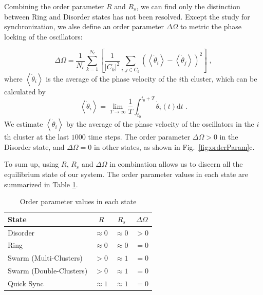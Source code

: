 \documentclass[%
 aip,
 amsmath,amssymb,
 reprint,%
]{revtex4-1}
\begin{document}
Combining the order parameter $R$ and $R_s$, we can find only the distinction between Ring and Disorder states has not been resolved. Except the study for synchronization, we alse define an order parameter $\Delta \Omega$ to metric the phase locking of the oscillators:

\begin{equation}
    \Delta \Omega =\frac{1}{N_c}\sum_{k=1}^{N_c}{\left[ \frac{1}{\left| C_k \right|^2}\sum_{i,j\in C_k}{\left( \left< \dot{\theta}_i \right> -\left< \dot{\theta}_j \right> \right) ^2} \right]}\;,
\end{equation}
where $\left< \dot{\theta}_i \right>$ is the average of the phase velocity of the $i$th cluster, which can be calculated by
\begin{equation}
    \left< \dot{\theta}_i \right> =\lim_{T\rightarrow \infty} \frac{1}{T}\int_{t_0}^{t_0+T}{\dot{\theta}_i\left( t \right) \mathrm{d}t}\;.
\end{equation}
We estimate $\left< \dot{\theta}_i \right>$ by the average of the phase velocity of the oscillators in the $i$th cluster at the last $1000$ time steps. 
The order parameter $\Delta \Omega > 0$ in the Disorder state, and $\Delta \Omega = 0$ in other states, as shown in Fig.~\ref{fig:orderParam}c.

To sum up, using $R$, $R_s$ and $\Delta \Omega$ in combination allows us to discern all the equilibrium state of our system.
The order parameter values in each state are summarized in Table \ref{tab:orderParam}.

\begin{table}
    \caption{\label{tab:orderParam} Order parameter values in each state 
    }
    \begin{ruledtabular}
        \begin{tabular}{lccc}
        State& $R$ & $R_s$ & $\Delta\Omega$ \\
        \hline
        Disorder&$\approx 0$&$\approx 0$&$> 0$\\
        Ring&$\approx 0$&$\approx 0$&$= 0$\\
        Swarm (Multi-Clusters)&$> 0$&$\approx 1$\footnotemark[1]&$= 0$\\
        Swarm (Double-Clusters)&$> 0$&$\approx 1$&$= 0$\\
        Quick Sync&$\approx 1$&$\approx 1$&$= 0$\\
        \end{tabular}
    \end{ruledtabular}
\end{table}
\end{document}
